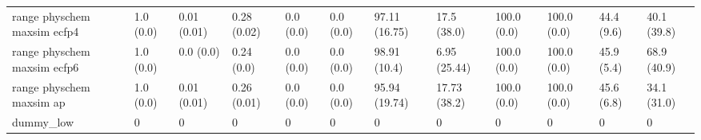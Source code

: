 \begin{tabular}{llllllllllll}
range physchem maxsim ecfp4 & {\cellcolor[HTML]{F6FCFD}} \color[HTML]{000000} 1.0 (0.0) & {\cellcolor[HTML]{F7FCFD}} \color[HTML]{000000} 0.01 (0.01) & {\cellcolor[HTML]{C2E8E0}} \color[HTML]{000000} 0.28 (0.02) & {\cellcolor[HTML]{F7FCFD}} \color[HTML]{000000} 0.0 (0.0) & {\cellcolor[HTML]{F7FCFD}} \color[HTML]{000000} 0.0 (0.0) & {\cellcolor[HTML]{004D1F}} \color[HTML]{F1F1F1} 97.11 (16.75) & {\cellcolor[HTML]{DBF2F2}} \color[HTML]{000000} 17.5 (38.0) & {\cellcolor[HTML]{00441B}} \color[HTML]{F1F1F1} 100.0 (0.0) & {\cellcolor[HTML]{00441B}} \color[HTML]{F1F1F1} 100.0 (0.0) & {\cellcolor[HTML]{7DCCB5}} \color[HTML]{000000} 44.4 (9.6) & {\cellcolor[HTML]{8FD4C2}} \color[HTML]{000000} 40.1 (39.8) \\
range physchem maxsim ecfp6 & {\cellcolor[HTML]{F6FCFD}} \color[HTML]{000000} 1.0 (0.0) & {\cellcolor[HTML]{F6FCFD}} \color[HTML]{000000} 0.0 (0.0) & {\cellcolor[HTML]{CEEDE8}} \color[HTML]{000000} 0.24 (0.0) & {\cellcolor[HTML]{F7FCFD}} \color[HTML]{000000} 0.0 (0.0) & {\cellcolor[HTML]{F7FCFD}} \color[HTML]{000000} 0.0 (0.0) & {\cellcolor[HTML]{00471C}} \color[HTML]{F1F1F1} 98.91 (10.4) & {\cellcolor[HTML]{EDF8FB}} \color[HTML]{000000} 6.95 (25.44) & {\cellcolor[HTML]{00441B}} \color[HTML]{F1F1F1} 100.0 (0.0) & {\cellcolor[HTML]{00441B}} \color[HTML]{F1F1F1} 100.0 (0.0) & {\cellcolor[HTML]{77C9B0}} \color[HTML]{000000} 45.9 (5.4) & {\cellcolor[HTML]{319C5C}} \color[HTML]{F1F1F1} 68.9 (40.9) \\
range physchem maxsim ap & {\cellcolor[HTML]{F6FCFD}} \color[HTML]{000000} 1.0 (0.0) & {\cellcolor[HTML]{F7FCFD}} \color[HTML]{000000} 0.01 (0.01) & {\cellcolor[HTML]{C7EAE3}} \color[HTML]{000000} 0.26 (0.01) & {\cellcolor[HTML]{F7FCFD}} \color[HTML]{000000} 0.0 (0.0) & {\cellcolor[HTML]{F7FCFD}} \color[HTML]{000000} 0.0 (0.0) & {\cellcolor[HTML]{005120}} \color[HTML]{F1F1F1} 95.94 (19.74) & {\cellcolor[HTML]{DBF1F1}} \color[HTML]{000000} 17.73 (38.2) & {\cellcolor[HTML]{00441B}} \color[HTML]{F1F1F1} 100.0 (0.0) & {\cellcolor[HTML]{00441B}} \color[HTML]{F1F1F1} 100.0 (0.0) & {\cellcolor[HTML]{78CAB1}} \color[HTML]{000000} 45.6 (6.8) & {\cellcolor[HTML]{A7DDD1}} \color[HTML]{000000} 34.1 (31.0) \\
dummy_low & {\cellcolor[HTML]{F7FCFD}} \color[HTML]{000000} 0 & {\cellcolor[HTML]{F7FCFD}} \color[HTML]{000000} 0 & {\cellcolor[HTML]{F7FCFD}} \color[HTML]{000000} 0 & {\cellcolor[HTML]{F7FCFD}} \color[HTML]{000000} 0 & {\cellcolor[HTML]{F7FCFD}} \color[HTML]{000000} 0 & {\cellcolor[HTML]{F7FCFD}} \color[HTML]{000000} 0 & {\cellcolor[HTML]{F7FCFD}} \color[HTML]{000000} 0 & {\cellcolor[HTML]{F7FCFD}} \color[HTML]{000000} 0 & {\cellcolor[HTML]{F7FCFD}} \color[HTML]{000000} 0 & {\cellcolor[HTML]{F7FCFD}} \color[HTML]{000000} 0 & {\cellcolor[HTML]{F7FCFD}} \color[HTML]{000000} 0 \\

\end{tabular}
